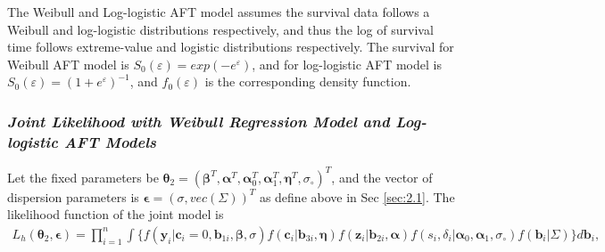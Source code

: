 The Weibull and Log-logistic AFT model assumes the survival data follows a Weibull and log-logistic distributions respectively, and thus the log of survival time follows extreme-value and logistic distributions respectively. The survival for Weibull AFT model is $S_0(\varepsilon)=exp(-e^{\varepsilon})$, and for log-logistic AFT model is $S_0(\varepsilon)=(1+e^{\varepsilon})^{-1}$, and $f_0(\varepsilon)$ is the corresponding density function.

\subsubsection*{\textit{Joint Likelihood with Weibull Regression Model and Log-logistic AFT Models}}

Let the fixed parameters be $\boldsymbol{\theta}_2 = (\boldsymbol{\beta}^T,\boldsymbol{\alpha}^T,\boldsymbol{\alpha}_0^T, \boldsymbol{\alpha}_1^T, \boldsymbol{\eta}^T, \sigma_{\circ})^T$, and the vector of dispersion parameters is $\boldsymbol{\epsilon}=(\sigma, vec({\Sigma}))^T$ as define above in Sec \ref{sec:2.1}. 
The likelihood function of the joint model is
\begin{equation}
    \begin{split}
        L_{h}(\boldsymbol{\theta}_2,\boldsymbol{\epsilon}) = \prod_{i=1}^n \int\{ f(\boldsymbol{y}_{i}|\boldsymbol{c}_{i}=0,\boldsymbol{b}_{1i},\boldsymbol{\beta},\sigma) f(\boldsymbol{c}_{i}|\boldsymbol{b}_{3i},\boldsymbol{\eta}) f(\boldsymbol{z}_{i}|\boldsymbol{b}_{2i},\boldsymbol{\alpha}) f(s_i,\delta_i|\boldsymbol{\alpha}_0,\boldsymbol{\alpha}_1,\sigma_{\circ}) f(\boldsymbol{b}_i|\Sigma)\} d \boldsymbol{b}_i,
    \end{split}
\end{equation}


